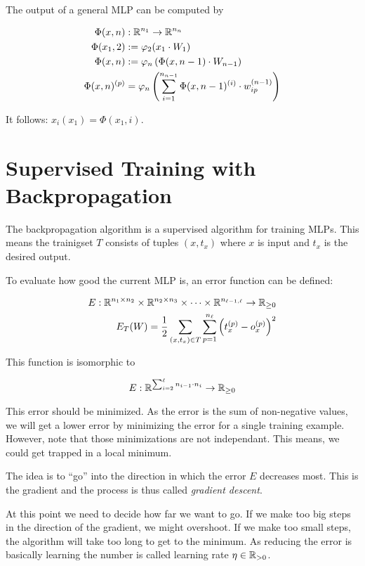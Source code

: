 The output of a general \gls{MLP} can be computed by

\begin{align*}
    \Phi(x, n) &: \mathbb{R}^{n_1} \rightarrow \mathbb{R}^{n_n}\\
    \Phi(x_1, 2) &:= \varphi_{2}(x_1 \cdot W_{1})\\
    \Phi(x, n) &:= \varphi_{n} \left (\Phi(x, n-1) \cdot W_{n-1} \right)\\
    \Phi(x, n)^{(p)} &= \varphi_n \left ( \sum_{i=1}^{n_{n-1}} \Phi(x, n-1)^{(i)} \cdot w_{ip}^{(n-1)} \right )
\end{align*}

It follows: $x_i(x_1) = \Phi(x_1, i)$.

\section{Supervised Training with Backpropagation}\label{sec:training}
The backpropagation algorithm is a supervised algorithm for training
\glspl{MLP}. This means the trainigset $T$ consists of tuples $(x, t_x)$
where $x$ is input and $t_x$ is the desired output.

To evaluate how good the current \gls{MLP} is, an error function can be defined:

\begin{align*}
    E: \mathbb{R}^{n_1 \times n_2} \times \mathbb{R}^{n_2 \times n_3} \times \dots \times \mathbb{R}^{n_{{\ell}-1, {\ell}}} \rightarrow \mathbb{R}_{\geq 0}\\
    E_T(W) = \frac{1}{2} \sum_{(x, t_x) \in T} \sum_{p = 1}^{n_{\ell}} \left (t_{x}^{(p)} - o_{x}^{(p)} \right )^2
\end{align*}

This function is isomorphic to 

\[E: \mathbb{R}^{\sum_{i=2}^{\ell} n_{i-1} \cdot n_{i}} \rightarrow \mathbb{R}_{\geq 0}\]

This error should be minimized. As the error is the sum of non-negative values,
we will get a lower error by minimizing the error for a single training example.
However, note that those minimizations are not independant. This means, we could
get trapped in a local minimum.

The idea is to \enquote{go} into the direction in which the error $E$ decreases
most. This is the gradient and the process is thus called \textit{gradient descent}.

At this point we need to decide how far we want to go. If we make too big steps
in the direction of the gradient, we might overshoot. If we make too small steps,
the algorithm will take too long to get to the minimum. As reducing the error
is basically learning the number is called learning rate $\eta \in \mathbb{R}_{> 0}$.

